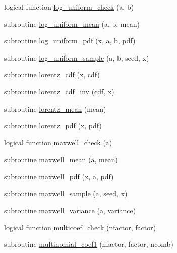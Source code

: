 \begin{DoxyCompactItemize}
\item 
logical function \hyperlink{_bhabha__fortran__sem__doxy_8f_ac8db4920c6abba6ea655fdc986813e62}{log\+\_\+uniform\+\_\+check} (a, b)
\item 
subroutine \hyperlink{_bhabha__fortran__sem__doxy_8f_a87623ea0ca476d299aefc8ad2fe08737}{log\+\_\+uniform\+\_\+mean} (a, b, mean)
\item 
subroutine \hyperlink{_bhabha__fortran__sem__doxy_8f_a2e6d975a71a9e29048cc71f0f1c34702}{log\+\_\+uniform\+\_\+pdf} (x, a, b, pdf)
\item 
subroutine \hyperlink{_bhabha__fortran__sem__doxy_8f_af90ae492b3515c794d1306f8ccf26c05}{log\+\_\+uniform\+\_\+sample} (a, b, seed, x)
\item 
subroutine \hyperlink{_bhabha__fortran__sem__doxy_8f_a2d42ac4119c6b4409d419ed9e81a03a0}{lorentz\+\_\+cdf} (x, cdf)
\item 
subroutine \hyperlink{_bhabha__fortran__sem__doxy_8f_a84e9578341d986571a9a7c3aeb2686cc}{lorentz\+\_\+cdf\+\_\+inv} (cdf, x)
\item 
subroutine \hyperlink{_bhabha__fortran__sem__doxy_8f_ad35ecd2cd051d54d3d353c19535da898}{lorentz\+\_\+mean} (mean)
\item 
subroutine \hyperlink{_bhabha__fortran__sem__doxy_8f_aea9281c529fa599fe1103e8d74d33ddc}{lorentz\+\_\+pdf} (x, pdf)
\item 
logical function \hyperlink{_bhabha__fortran__sem__doxy_8f_a564cd13e2df2d52e551d88aa36765b6a}{maxwell\+\_\+check} (a)
\item 
subroutine \hyperlink{_bhabha__fortran__sem__doxy_8f_a3f296baf8d60383b265a902b92a27492}{maxwell\+\_\+mean} (a, mean)
\item 
subroutine \hyperlink{_bhabha__fortran__sem__doxy_8f_aa5b48a50fd2163385ad84b879e0721ef}{maxwell\+\_\+pdf} (x, a, pdf)
\item 
subroutine \hyperlink{_bhabha__fortran__sem__doxy_8f_a288b473fa5808b049b36853ca23b9285}{maxwell\+\_\+sample} (a, seed, x)
\item 
subroutine \hyperlink{_bhabha__fortran__sem__doxy_8f_abd87aa98d26597779513c64c2fbe17e5}{maxwell\+\_\+variance} (a, variance)
\item 
logical function \hyperlink{_bhabha__fortran__sem__doxy_8f_a7119e53d608affd356f7026eef9d2c6b}{multicoef\+\_\+check} (nfactor, factor)
\item 
subroutine \hyperlink{_bhabha__fortran__sem__doxy_8f_a46d0e2c4bd77aa17906a0c078644ef70}{multinomial\+\_\+coef1} (nfactor, factor, ncomb)
\item 

\end{DoxyCompactItemize}
